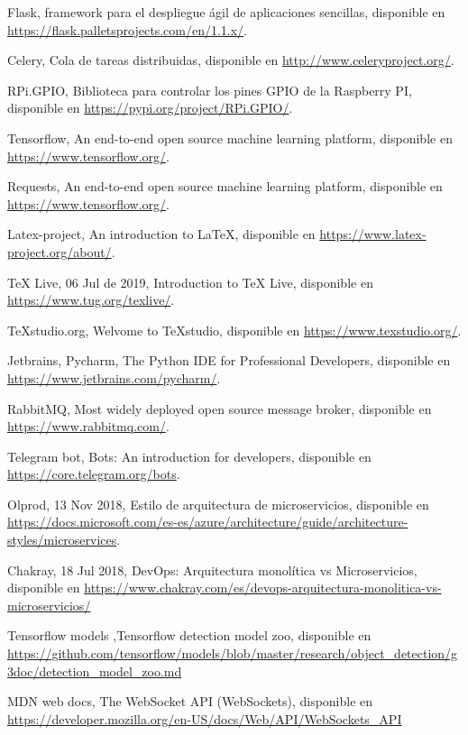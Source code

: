 \begin{thebibliography}{99}
	 Flask, framework para el despliegue ágil de aplicaciones sencillas, disponible en \url{https://flask.palletsprojects.com/en/1.1.x/}.
	
	 Celery, Cola de tareas distribuidas, disponible en \url{http://www.celeryproject.org/}.
	
	 RPi.GPIO, Biblioteca para controlar los pines GPIO de la Raspberry PI, disponible en \url{https://pypi.org/project/RPi.GPIO/}.
	
	 Tensorflow, An end-to-end open source machine learning platform, disponible en \url{https://www.tensorflow.org/}.
	
	 Requests, An end-to-end open source machine learning platform, disponible en \url{https://www.tensorflow.org/}.
	
	 Latex-project, An introduction to LaTeX, disponible en \url{https://www.latex-project.org/about/}.

	 TeX Live, 06 Jul de 2019, Introduction to TeX Live, disponible en \url{https://www.tug.org/texlive/}.
	
	 TeXstudio.org, Welvome to TeXstudio, disponible en \url{https://www.texstudio.org/}.

	 Jetbrains, Pycharm, The Python IDE
	for Professional Developers, disponible en \url{https://www.jetbrains.com/pycharm/}.
	
	 RabbitMQ, Most widely deployed open source message broker, disponible en \url{https://www.rabbitmq.com/}.
	
	 Telegram bot, Bots: An introduction for developers, disponible en \url{https://core.telegram.org/bots}.
	
	 Olprod, 13 Nov 2018, Estilo de arquitectura de microservicios, disponible en \url{https://docs.microsoft.com/es-es/azure/architecture/guide/architecture-styles/microservices}.

	 Chakray, 18 Jul 2018, DevOps: Arquitectura monolítica vs Microservicios, disponible en \url{https://www.chakray.com/es/devops-arquitectura-monolitica-vs-microservicios/}
	
	 Tensorflow models ,Tensorflow detection model zoo, disponible en \url{https://github.com/tensorflow/models/blob/master/research/object_detection/g3doc/detection_model_zoo.md}
	
	 MDN web docs, The WebSocket API (WebSockets), disponible en \url{https://developer.mozilla.org/en-US/docs/Web/API/WebSockets_API}
	

\end{thebibliography}
